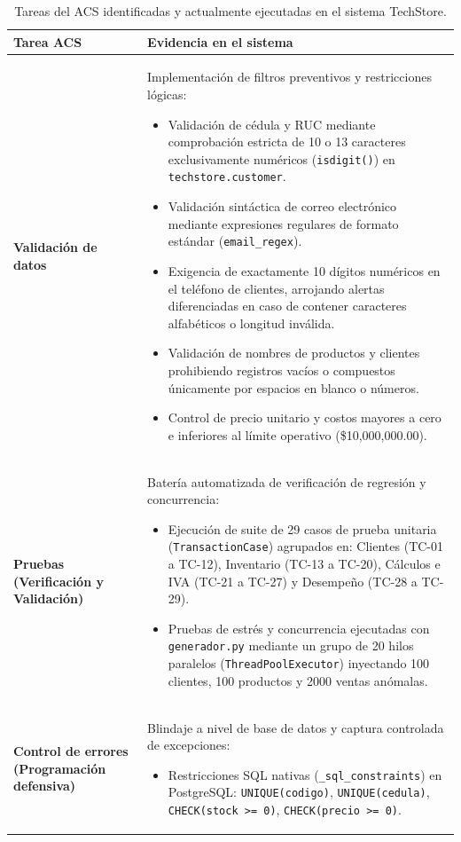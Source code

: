\documentclass{article}
\begin{document}
\begin{table}[H]
\centering
\caption{Tareas del ACS identificadas y actualmente ejecutadas en el sistema TechStore.}
\label{tab:tareas_acs}
\renewcommand{\arraystretch}{1.3}
\begin{tabularx}{\textwidth}{p{3.8cm}X}
\toprule
\textbf{Tarea ACS} & \textbf{Evidencia en el sistema} \\
\midrule
\textbf{Validación de datos} & 
Implementación de filtros preventivos y restricciones lógicas:
\begin{itemize}
    \item Validación de cédula y RUC mediante comprobación estricta de 10 o 13 caracteres exclusivamente numéricos (\texttt{isdigit()}) en \texttt{techstore.customer}.
    \item Validación sintáctica de correo electrónico mediante expresiones regulares de formato estándar (\texttt{email\_regex}).
    \item Exigencia de exactamente 10 dígitos numéricos en el teléfono de clientes, arrojando alertas diferenciadas en caso de contener caracteres alfabéticos o longitud inválida.
    \item Validación de nombres de productos y clientes prohibiendo registros vacíos o compuestos únicamente por espacios en blanco o números.
    \item Control de precio unitario y costos mayores a cero e inferiores al límite operativo (\$10,000,000.00).
\end{itemize} \\
\midrule
\textbf{Pruebas (Verificación y Validación)} & 
Batería automatizada de verificación de regresión y concurrencia:
\begin{itemize}
    \item Ejecución de suite de 29 casos de prueba unitaria (\texttt{TransactionCase}) agrupados en: Clientes (TC-01 a TC-12), Inventario (TC-13 a TC-20), Cálculos e IVA (TC-21 a TC-27) y Desempeño (TC-28 a TC-29).
    \item Pruebas de estrés y concurrencia ejecutadas con \texttt{generador.py} mediante un grupo de 20 hilos paralelos (\texttt{ThreadPoolExecutor}) inyectando 100 clientes, 100 productos y 2000 ventas anómalas.
\end{itemize} \\
\midrule
\textbf{Control de errores (Programación defensiva)} & 
Blindaje a nivel de base de datos y captura controlada de excepciones:
\begin{itemize}
    \item Restricciones SQL nativas (\texttt{\_sql\_constraints}) en PostgreSQL: \texttt{UNIQUE(codigo)}, \texttt{UNIQUE(cedula)}, \texttt{CHECK(stock >= 0)}, \texttt{CHECK(precio >= 0)}.

\end{itemize}
\end{tabularx}
\end{table}
\end{document}
